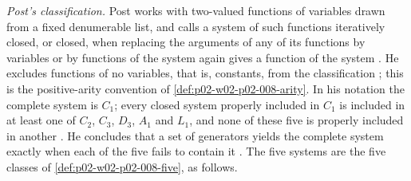 \emph{Post's classification.}  Post works with two-valued functions of
variables drawn from a fixed denumerable list, and calls a system of such
functions iteratively closed, or closed, when replacing the arguments of any
of its functions by variables or by functions of the system again gives a
function of the system \cite[\S\,1, pp.~10--11]{Post1941}.  He excludes
functions of no variables, that is, constants, from the classification
\cite[Introduction, pp.~2--3, n.~5]{Post1941}; this is the positive-arity
convention of \cref{def:p02-w02-p02-008-arity}.  In his notation the
complete system is \(C_1\); every closed system properly included in \(C_1\)
is included in at least one of \(C_2\), \(C_3\), \(D_3\), \(A_1\) and
\(L_1\), and none of these five is properly included in another
\cite[\S\,25, pp.~98--99]{Post1941}.  He concludes that a set of generators
yields the complete system exactly when each of the five fails to contain it
\cite[\S\,26, p.~105]{Post1941}.  The five systems are the five classes of
\cref{def:p02-w02-p02-008-five}, as follows.
